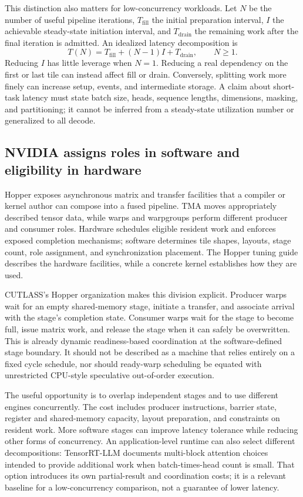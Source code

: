 This distinction also matters for low-concurrency workloads. Let $N$ be the number of useful pipeline iterations, $T_{\mathrm{fill}}$ the initial preparation interval, $I$ the achievable steady-state initiation interval, and $T_{\mathrm{drain}}$ the remaining work after the final iteration is admitted. An idealized latency decomposition is
\begin{equation}
 T(N)=T_{\mathrm{fill}}+(N-1)I+T_{\mathrm{drain}},\qquad N\geq1.
\end{equation}
Reducing $I$ has little leverage when $N=1$. Reducing a real dependency on the first or last tile can instead affect fill or drain. Conversely, splitting work more finely can increase setup, events, and intermediate storage. A claim about short-task latency must state batch size, heads, sequence lengths, dimensions, masking, and partitioning; it cannot be inferred from a steady-state utilization number or generalized to all decode.

\subsection{NVIDIA assigns roles in software and eligibility in hardware}

Hopper exposes asynchronous matrix and transfer facilities that a compiler or kernel author can compose into a fused pipeline. TMA moves appropriately described tensor data, while warps and warpgroups perform different producer and consumer roles. Hardware schedules eligible resident work and enforces exposed completion mechanisms; software determines tile shapes, layouts, stage count, role assignment, and synchronization placement. The Hopper tuning guide describes the hardware facilities, while a concrete kernel establishes how they are used.~\citep{u001-hopper}

CUTLASS's Hopper organization makes this division explicit. Producer warps wait for an empty shared-memory stage, initiate a transfer, and associate arrival with the stage's completion state. Consumer warps wait for the stage to become full, issue matrix work, and release the stage when it can safely be overwritten.~\citep{u002-cutlass} This is already dynamic readiness-based coordination at the software-defined stage boundary. It should not be described as a machine that relies entirely on a fixed cycle schedule, nor should ready-warp scheduling be equated with unrestricted CPU-style speculative out-of-order execution.

The useful opportunity is to overlap independent stages and to use different engines concurrently. The cost includes producer instructions, barrier state, register and shared-memory capacity, layout preparation, and constraints on resident work. More software stages can improve latency tolerance while reducing other forms of concurrency. An application-level runtime can also select different decompositions: TensorRT-LLM documents multi-block attention choices intended to provide additional work when batch-times-head count is small. That option introduces its own partial-result and coordination costs; it is a relevant baseline for a low-concurrency comparison, not a guarantee of lower latency.~\citep{u001-trt-attention}

